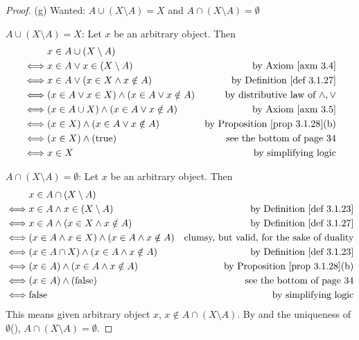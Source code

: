 \begin{proof}{(g)} Wanted: \(A \cup (X \setminus A) = X\) and \(A \cap (X \setminus A) = \emptyset\)

\(A \cup (X \setminus A) = X\): Let \(x\) be an arbitrary object. Then
\begin{align*}
         & x \in A \cup (X \setminus A) \\
    \iff & x \in A \lor x \in (X \setminus A) & \text{by \AXM{3.4}} \\
    \iff & x \in A \lor (x \in X \land x \notin A) & \text{by \DEF{3.1.27}} \\
    \iff & (x \in A \lor x \in X) \land (x \in A \lor x \notin A) & \text{by distributive law of \(\land, \lor\)} \\
    \iff & (x \in A \cup X) \land (x \in A \lor x \notin A) & \text{by \AXM{3.5}} \\
    \iff & (x \in X) \land (x \in A \lor x \notin A) & \text{by \PROP{3.1.28}(b)} \\
    \iff & (x \in X) \land (\text{true}) & \text{see the bottom of page 34} \\
    \iff & x \in X & \text{by simplifying logic}
\end{align*}

\(A \cap (X \setminus A) = \emptyset\): Let \(x\) be an arbitrary object. Then
\begin{align*}
         & x \in A \cap (X \setminus A) \\
    \iff & x \in A \land x \in (X \setminus A) & \text{by \DEF{3.1.23}} \\
    \iff & x \in A \land (x \in X \land x \notin A) & \text{by \DEF{3.1.27}} \\
    \iff & (x \in A \land x \in X) \land (x \in A \land x \notin A) & \text{clumsy, but valid, for the sake of duality} \\
    \iff & (x \in A \cap X) \land (x \in A \land x \notin A) & \text{by \DEF{3.1.23}} \\
    \iff & (x \in A) \land (x \in A \land x \notin A) & \text{by \PROP{3.1.28}(b)} \\
    \iff & (x \in A) \land (\text{false}) & \text{see the bottom of page 34} \\
    \iff & \text{false} & \text{by simplifying logic}
\end{align*}
This means given arbitrary object \(x\), \(x \notin A \cap (X \setminus A)\). By  and the uniqueness of \(\emptyset\)(), \(A \cap (X \setminus A) = \emptyset\).
\end{proof}

